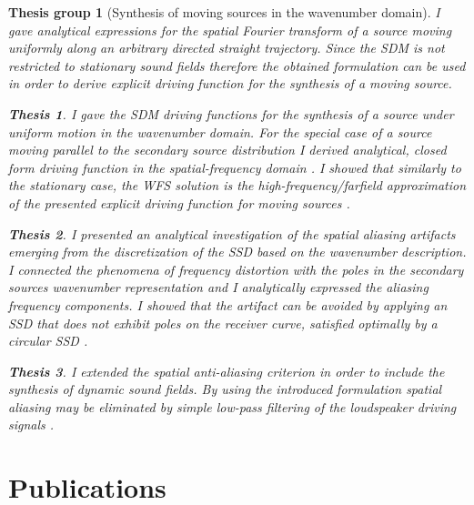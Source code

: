 \documentclass[10pt,twoside]{article}
\theoremstyle{thesisgroupstyle}
\newtheorem{thesisgroup}{Thesis group}
\theoremstyle{indented}
\newtheorem{thesis}{Thesis}[thesisgroup]
\begin{document}
\begin{thesisgroup}[Synthesis of moving sources in the wavenumber domain]

I gave analytical expressions for the spatial Fourier transform of a source moving uniformly along an arbitrary directed straight trajectory. 
Since the SDM is not restricted to stationary sound fields therefore the obtained formulation can be used in order to derive explicit driving function for the synthesis of a moving source.
\begin{thesis} 
I gave the SDM driving functions for the synthesis of a source under uniform motion in the wavenumber domain.
For the special case of a source moving parallel to the secondary source distribution I derived analytical, closed form driving function in the spatial-frequency domain \cite{Firtha2014:daga_booklet, Firtha2014:isma_booklet, firtha2015sound_booklet}.
I showed that similarly to the stationary case, the WFS solution is the high-frequency/farfield approximation of the presented explicit driving function for moving sources \cite{firtha2015sound_booklet}. 
\end{thesis}
\begin{thesis} 
I presented an analytical investigation of the spatial aliasing artifacts emerging from the discretization of the SSD based on the wavenumber description.
I connected the phenomena of frequency distortion with the poles in the secondary sources wavenumber representation and I analytically expressed the aliasing frequency components.
I showed that the artifact can be avoided by applying an SSD that does not exhibit poles on the receiver curve, satisfied optimally by a circular SSD \cite{firtha2016:daga_booklet}.
\end{thesis}
\begin{thesis} 
I extended the spatial anti-aliasing criterion in order to include the synthesis of dynamic sound fields.
By using the introduced formulation spatial aliasing may be eliminated by simple low-pass filtering of the loudspeaker driving signals \cite{Firtha2018_daga_moving_source_booklet}.
\end{thesis}
\end{thesisgroup} 
\clearpage
\section*{Publications}

\nocite{*}
\begin{refcontext}[labelprefix=J]
\printbibliography[title={Journal papers}, keyword=J, heading=subbibliography] 
\end{refcontext}
\begin{refcontext}[labelprefix=C]
\printbibliography[title={Conference papers}, keyword=C, heading=subbibliography] 
\end{refcontext}
\begin{refcontext}[labelprefix=O]
\printbibliography[title={Other publications}, keyword=O, heading=subbibliography] 
\end{refcontext}
\end{document}
